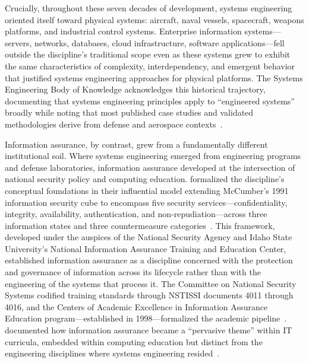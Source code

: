 Crucially, throughout these seven decades of development, systems engineering oriented itself toward physical systems: aircraft, naval vessels, spacecraft, weapons platforms, and industrial control systems. Enterprise information systems---servers, networks, databases, cloud infrastructure, software applications---fell outside the discipline's traditional scope even as these systems grew to exhibit the same characteristics of complexity, interdependency, and emergent behavior that justified systems engineering approaches for physical platforms. The Systems Engineering Body of Knowledge acknowledges this historical trajectory, documenting that systems engineering principles apply to ``engineered systems'' broadly while noting that most published case studies and validated methodologies derive from defense and aerospace contexts~\parencite{SEBoK_2024}.

Information assurance, by contrast, grew from a fundamentally different institutional soil. Where systems engineering emerged from engineering programs and defense laboratories, information assurance developed at the intersection of national security policy and computing education. \citeauthor{Maconachy_2001} formalized the discipline's conceptual foundations in their influential model extending McCumber's 1991 information security cube to encompass five security services---confidentiality, integrity, availability, authentication, and non-repudiation---across three information states and three countermeasure categories~\parencite{Maconachy_2001}. This framework, developed under the auspices of the National Security Agency and Idaho State University's National Information Assurance Training and Education Center, established information assurance as a discipline concerned with the protection and governance of information across its lifecycle rather than with the engineering of the systems that process it. The Committee on National Security Systems codified training standards through NSTISSI documents 4011 through 4016, and the Centers of Academic Excellence in Information Assurance Education program---established in 1998---formalized the academic pipeline~\parencite{Dark_2006}. \citeauthor{Dark_2006} documented how information assurance became a ``pervasive theme'' within IT curricula, embedded within computing education but distinct from the engineering disciplines where systems engineering resided~\parencite{Dark_2006}.

